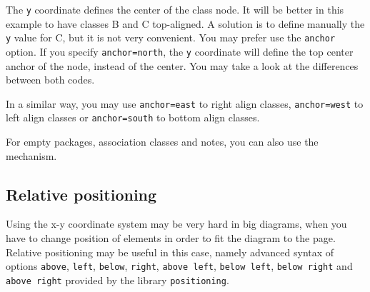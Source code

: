 \documentclass[a4paper,11pt]{report}
\begin{document}
\medskip

\begin{minipage}{0.5\textwidth}

\end{minipage}
\begin{minipage}{0.5\textwidth}
\begin{center}
\end{center}
\end{minipage}

\medskip

The {\tt y} coordinate defines the center of the class node. It will be better in this example to have classes B and C top-aligned. A solution is to define manually the {\tt y} value for C, but it is not very convenient. You may prefer use the {\tt anchor} option. If you specify {\tt anchor=north}, the {\tt y} coordinate will define the top center anchor of the node, instead of the center. You may take a look at the differences between both codes.

\medskip

\begin{minipage}{0.5\textwidth}

\end{minipage}
\begin{minipage}{0.5\textwidth}
\begin{center}
\end{center}
\end{minipage}

\medskip

In a similar way, you may use {\tt anchor=east} to right align classes, {\tt anchor=west} to left align classes or {\tt anchor=south} to bottom align classes.

\medskip

For empty packages, association classes and notes, you can also use the mechanism.

\subsection{Relative positioning}\label{ss.relpos}

Using the x-y coordinate system may be very hard in big diagrams, when you have to change position of elements in order to fit the diagram to the page. Relative positioning may be useful in this case, namely advanced syntax of options {\tt above}, {\tt left}, {\tt below}, {\tt right}, {\tt above left}, {\tt below left}, {\tt below right} and {\tt above right} provided by the \TikZ library {\tt positioning}.
\end{document}
